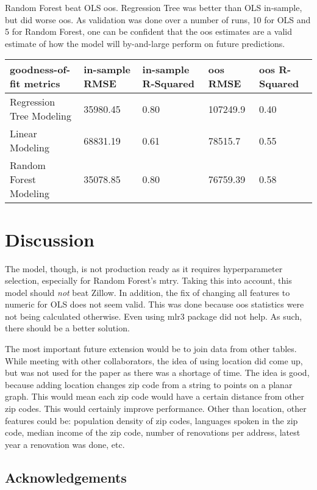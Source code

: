 \documentclass{article}
\begin{document}
Random Forest beat OLS oos. Regression Tree was better than OLS in-sample, but did worse oos. As validation was done over a number of runs, 10 for OLS and 5 for Random Forest, one can be confident that the oos estimates are a valid estimate of how the model will by-and-large perform on future predictions. 

\begin{table}[htb]
\begin{tabular}{|l|l|l|l|l|}
\hline
goodness-of-fit metrics  & in-sample RMSE & in-sample R-Squared & oos RMSE & oos R-Squared \\ \hline
Regression Tree Modeling & 35980.45       & 0.80                & 107249.9 & 0.40          \\ \hline
Linear Modeling          & 68831.19       & 0.61                & 78515.7  & 0.55          \\ \hline
Random Forest Modeling   & 35078.85       & 0.80                & 76759.39 & 0.58          \\ \hline
\end{tabular}
\end{table}

\section{Discussion}

The model, though, is not production ready as it requires hyperparameter selection, especially for Random Forest's mtry. Taking this into account, this model should \emph{not} beat Zillow. In addition, the fix of changing all features to numeric for OLS does not seem valid. This was done because oos statistics were not being calculated otherwise. Even using mlr3 package did not help. As such, there should be a better solution.

The most important future extension would be to join data from other tables. While meeting with other collaborators, the idea of using location did come up, but was not used for the paper as there was a shortage of time. The idea is good, because adding location changes zip code from a string to points on a planar graph. This would mean each zip code would have a certain distance from other zip codes. This would certainly improve performance. Other than location, other features could be: population density of zip codes, languages spoken in the zip code, median income of the zip code, number of renovations per address, latest year a renovation was done, etc.

\subsection*{Acknowledgements}
\end{document}
